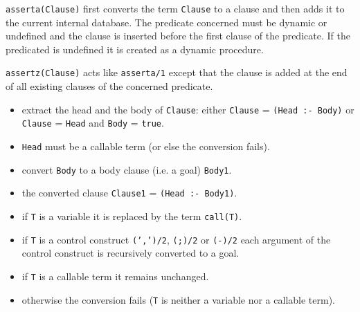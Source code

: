 \Description

\texttt{asserta(Clause)} first converts the term \texttt{Clause} to a clause
and then adds it to the current internal database. The predicate concerned
must be dynamic  or
undefined and the clause is inserted before the first clause of the
predicate. If the predicated is undefined it is created as a dynamic
procedure.

\texttt{assertz(Clause)} acts like \texttt{asserta/1} except that the clause
is added at the end of all existing clauses of the concerned predicate.


\begin{itemize}

\item extract the head and the body of \texttt{Clause}: either
\texttt{Clause} = \texttt{(Head :- Body)} or \texttt{Clause} = \texttt{Head}
and \texttt{Body} = \texttt{true}.

\item \texttt{Head} must be a callable term (or else the conversion fails).

\item convert \texttt{Body} to a body clause (i.e. a goal) \texttt{Body1}.

\item the converted clause \texttt{Clause1} = \texttt{(Head :- Body1)}.

\end{itemize}


\begin{itemize}

\item if \texttt{T} is a variable it is replaced by the term
\texttt{call(T)}.

\item if \texttt{T} is a control construct \texttt{(',')/2}, \texttt{(;)/2}
or \texttt{(-{\gt})/2} each argument of the control construct is recursively
converted to a goal.

\item if \texttt{T} is a callable term it remains unchanged.

\item otherwise the conversion fails (\texttt{T} is neither a variable nor a
callable term).

\end{itemize}

